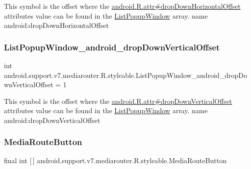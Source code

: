 This symbol is the offset where the \hyperlink{}{android.\+R.\+attr\#drop\+Down\+Horizontal\+Offset} attribute\textquotesingle{}s value can be found in the \hyperlink{classandroid_1_1support_1_1v7_1_1mediarouter_1_1R_1_1styleable_abd77b8b3a632f63ef1efadea7d411dd4}{List\+Popup\+Window} array.  name android\+:drop\+Down\+Horizontal\+Offset \mbox{\label{classandroid_1_1support_1_1v7_1_1mediarouter_1_1R_1_1styleable_a26f2cebc2eb4324dd371516539bed16b}} 
\subsubsection{\texorpdfstring{List\+Popup\+Window\+\_\+android\+\_\+drop\+Down\+Vertical\+Offset}{ListPopupWindow\_android\_dropDownVerticalOffset}}
{\footnotesize\ttfamily int android.\+support.\+v7.\+mediarouter.\+R.\+styleable.\+List\+Popup\+Window\+\_\+android\+\_\+drop\+Down\+Vertical\+Offset = 1\hspace{0.3cm}{\ttfamily [static]}}

This symbol is the offset where the \hyperlink{}{android.\+R.\+attr\#drop\+Down\+Vertical\+Offset} attribute\textquotesingle{}s value can be found in the \hyperlink{classandroid_1_1support_1_1v7_1_1mediarouter_1_1R_1_1styleable_abd77b8b3a632f63ef1efadea7d411dd4}{List\+Popup\+Window} array.  name android\+:drop\+Down\+Vertical\+Offset \mbox{\label{classandroid_1_1support_1_1v7_1_1mediarouter_1_1R_1_1styleable_a3ffcf56e5764450d86df9877ffb66258}} 
\subsubsection{\texorpdfstring{Media\+Route\+Button}{MediaRouteButton}}
{\footnotesize\ttfamily final int \mbox{[}$\,$\mbox{]} android.\+support.\+v7.\+mediarouter.\+R.\+styleable.\+Media\+Route\+Button\hspace{0.3cm}{\ttfamily [static]}}

